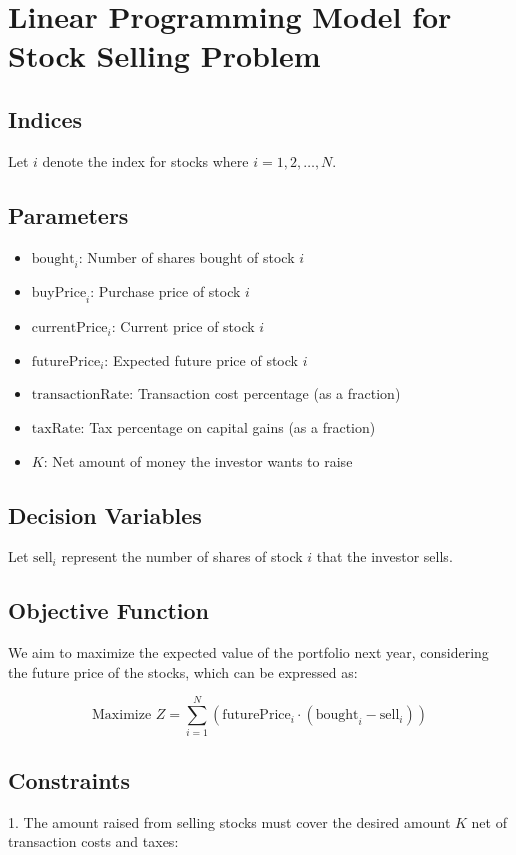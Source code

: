 \documentclass{article}
\begin{document}
\section*{Linear Programming Model for Stock Selling Problem}

\subsection*{Indices}
Let \( i \) denote the index for stocks where \( i = 1, 2, \ldots, N \).

\subsection*{Parameters}
\begin{itemize}
    \item \( \text{bought}_i \): Number of shares bought of stock \( i \)
    \item \( \text{buyPrice}_i \): Purchase price of stock \( i \)
    \item \( \text{currentPrice}_i \): Current price of stock \( i \)
    \item \( \text{futurePrice}_i \): Expected future price of stock \( i \)
    \item \( \text{transactionRate} \): Transaction cost percentage (as a fraction)
    \item \( \text{taxRate} \): Tax percentage on capital gains (as a fraction)
    \item \( K \): Net amount of money the investor wants to raise
\end{itemize}

\subsection*{Decision Variables}
Let \( \text{sell}_i \) represent the number of shares of stock \( i \) that the investor sells.

\subsection*{Objective Function}
We aim to maximize the expected value of the portfolio next year, considering the future price of the stocks, which can be expressed as:

\[
\text{Maximize } Z = \sum_{i=1}^{N} \left( \text{futurePrice}_i \cdot \left( \text{bought}_i - \text{sell}_i \right) \right)
\]

\subsection*{Constraints}
1. The amount raised from selling stocks must cover the desired amount \( K \) net of transaction costs and taxes:
\end{document}
